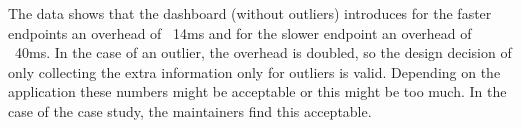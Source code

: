	The data shows that the dashboard (without outliers) introduces for the faster endpoints an overhead of ~14ms and for the slower endpoint an overhead of ~40ms. 
	In the case of an outlier, the overhead is doubled, so the design decision of only collecting the extra information only for outliers is valid.
	Depending on the application these numbers might be acceptable or this might be too much. In the case of the \zee case study, the maintainers find this acceptable. 



  